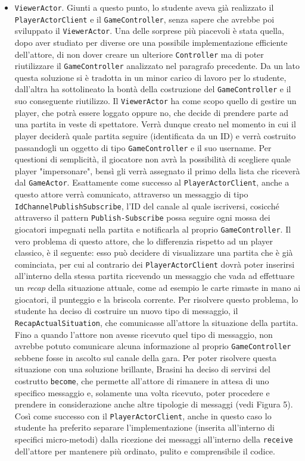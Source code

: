 \begin{itemize}
     \item \texttt{ViewerActor}.
     Giunti a questo punto, lo studente aveva già realizzato il \texttt{PlayerActorClient} e il \texttt{GameController}, senza sapere che avrebbe poi sviluppato il \texttt{ViewerActor}. Una delle sorprese più piacevoli è stata quella, dopo aver studiato per diverse ore una possibile implementazione efficiente dell'attore, di non dover creare un ulteriore \texttt{Controller} ma di poter riutilizzare il \texttt{GameController} analizzato nel paragrafo precedente. Da un lato questa soluzione si è tradotta in un minor carico di lavoro per lo studente, dall'altra ha sottolineato la bontà della costruzione del \texttt{GameController} e il suo conseguente riutilizzo. Il \texttt{ViewerActor} ha come scopo quello di gestire un player, che potrà essere loggato oppure no, che decide di prendere parte ad una partita in veste di spettatore. Verrà dunque creato nel momento in cui il player deciderà quale partita seguire (identificata da un ID) e verrà costruito passandogli un oggetto di tipo \texttt{GameController} e il suo username. Per questioni di semplicità, il giocatore non avrà la possibilità di scegliere quale player "impersonare", bensì gli verrà assegnato il primo della lista che riceverà dal \texttt{GameActor}. Esattamente come successo al \texttt{PlayerActorClient}, anche a questo attore verrà comunicato, attraverso un messaggio di tipo \texttt{IdChannelPublishSubscribe}, l'ID del canale al quale iscriversi, cosicché attraverso il pattern \texttt{Publish-Subscribe} possa seguire ogni mossa dei giocatori impegnati nella partita e notificarla al proprio \texttt{GameController}. Il vero problema di questo attore, che lo differenzia rispetto ad un player classico, è il seguente: esso può decidere di visualizzare una partita che è già cominciata, per cui al contrario dei \texttt{PlayerActorClient} dovrà poter inserirsi all'interno della stessa partita ricevendo un messaggio che vada ad effettuare un \textit{recap} della situazione attuale, come ad esempio le carte rimaste in mano ai giocatori, il punteggio e la briscola corrente. Per risolvere questo problema, lo studente ha deciso di costruire un nuovo tipo di messaggio, il \texttt{RecapActualSituation}, che comunicasse all'attore la situazione della partita. Fino a quando l'attore non avesse ricevuto quel tipo di messaggio, non avrebbe potuto comunicare alcuna informazione al proprio \texttt{GameController} sebbene fosse in ascolto sul canale della gara. Per poter risolvere questa situazione con una soluzione brillante, Brasini ha deciso di servirsi del costrutto \texttt{become}, che permette all'attore di rimanere in attesa di uno specifico messaggio e, solamente una volta ricevuto, poter procedere e prendere in considerazione anche altre tipologie di messaggi (vedi Figura 5). Così come successo con il \texttt{PlayerActorClient}, anche in questo caso lo studente ha preferito separare l'implementazione (inserita all'interno di specifici micro-metodi) dalla ricezione dei messaggi all'interno della \texttt{receive} dell'attore per mantenere più ordinato, pulito e comprensibile il codice. 
     

\end{itemize}
